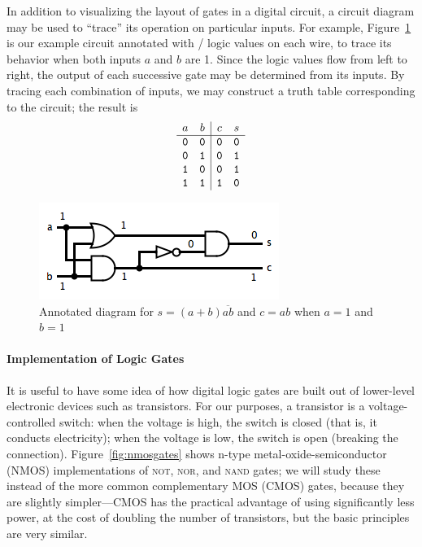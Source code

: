 In addition to visualizing the layout of gates in a digital circuit, a circuit diagram may be used to ``trace'' its operation on particular inputs. For example, Figure~\ref{fig:exprcircuit11} is our example circuit annotated with \0/\1 logic values on each wire, to trace its behavior when both inputs $a$ and $b$ are 1. Since the logic values flow from left to right, the output of each successive gate may be determined from its inputs. By tracing each combination of inputs, we may construct a truth table corresponding to the circuit; the result is
\[ \begin{array}{cc|cc}
a  & b  & c & s\\ \hline
\mathtt{0} & \mathtt{0} & \mathtt{0} & \mathtt{0}\\
\mathtt{0} & \mathtt{1} & \mathtt{0} & \mathtt{1}\\
\mathtt{1} & \mathtt{0} & \mathtt{0} & \mathtt{1}\\
\mathtt{1} & \mathtt{1} & \mathtt{1} & \mathtt{0}
\end{array} \]
\begin{figure}
\begin{center}
\includegraphics[width=!,height=!,scale=0.75]{graphics/HalfAdder11.png}
\end{center}
\caption{Annotated diagram for $s=(a+b)\overline{ab}$ and $c=ab$ when $a=1$ and $b=1$}
\label{fig:exprcircuit11}
\end{figure}

\paragraph{Implementation of Logic Gates}

It is useful to have some idea of how digital logic gates are built out of lower-level electronic devices such as transistors. For our purposes, a transistor is a voltage-controlled switch: when the voltage is high, the switch is closed (that is, it conducts electricity); when the voltage is low, the switch is open (breaking the connection). Figure~\ref{fig:nmosgates} shows n-type metal-oxide-semiconductor (NMOS) implementations of \textsc{not}, \textsc{nor}, and \textsc{nand} gates; we will study these instead of the more common complementary MOS (CMOS) gates, because they are slightly simpler---CMOS has the practical advantage of using significantly less power, at the cost of doubling the number of transistors, but the basic principles are very similar.

